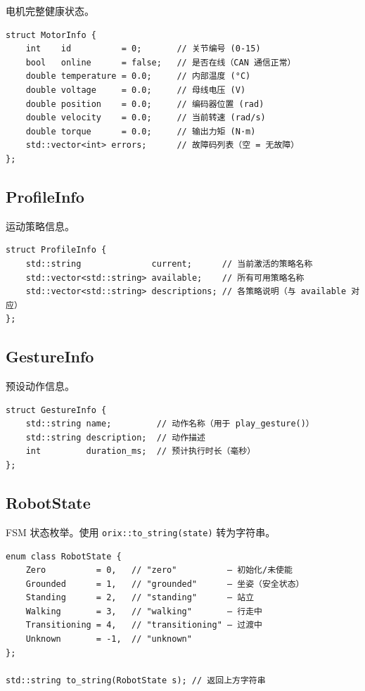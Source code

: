\documentclass[a4paper,11pt,openany]{book}
\begin{document}
电机完整健康状态。

\begin{lstlisting}[style=cpp,numbers=none]
struct MotorInfo {
    int    id          = 0;       // 关节编号 (0-15)
    bool   online      = false;   // 是否在线（CAN 通信正常）
    double temperature = 0.0;     // 内部温度 (°C)
    double voltage     = 0.0;     // 母线电压 (V)
    double position    = 0.0;     // 编码器位置 (rad)
    double velocity    = 0.0;     // 当前转速 (rad/s)
    double torque      = 0.0;     // 输出力矩 (N·m)
    std::vector<int> errors;      // 故障码列表（空 = 无故障）
};
\end{lstlisting}

\subsection{ProfileInfo}

运动策略信息。

\begin{lstlisting}[style=cpp,numbers=none]
struct ProfileInfo {
    std::string              current;      // 当前激活的策略名称
    std::vector<std::string> available;    // 所有可用策略名称
    std::vector<std::string> descriptions; // 各策略说明（与 available 对应）
};
\end{lstlisting}

\subsection{GestureInfo}

预设动作信息。

\begin{lstlisting}[style=cpp,numbers=none]
struct GestureInfo {
    std::string name;         // 动作名称（用于 play_gesture()）
    std::string description;  // 动作描述
    int         duration_ms;  // 预计执行时长（毫秒）
};
\end{lstlisting}

\subsection{RobotState}

FSM 状态枚举。使用 \texttt{orix::to\_string(state)} 转为字符串。

\begin{lstlisting}[style=cpp,numbers=none]
enum class RobotState {
    Zero          = 0,   // "zero"          — 初始化/未使能
    Grounded      = 1,   // "grounded"      — 坐姿（安全状态）
    Standing      = 2,   // "standing"      — 站立
    Walking       = 3,   // "walking"       — 行走中
    Transitioning = 4,   // "transitioning" — 过渡中
    Unknown       = -1,  // "unknown"
};

std::string to_string(RobotState s); // 返回上方字符串
\end{lstlisting}
\end{document}
